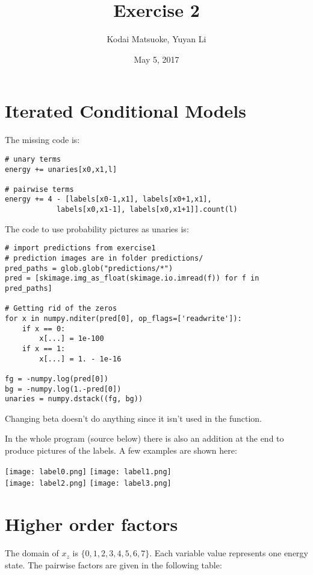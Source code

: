 \documentclass[12pt,a4paper]{scrartcl}
\author{Kodai Matsuoke, Yuyan Li}
\title{Exercise 2}
\date{May 5, 2017}
\begin{document}
\maketitle

\section{Iterated Conditional Models}

The missing code is:

\begin{verbatim}
# unary terms
energy += unaries[x0,x1,l]

# pairwise terms
energy += 4 - [labels[x0-1,x1], labels[x0+1,x1],
            labels[x0,x1-1], labels[x0,x1+1]].count(l)
\end{verbatim}

The code to use probability pictures as unaries is:

\begin{verbatim}
# import predictions from exercise1
# prediction images are in folder predictions/
pred_paths = glob.glob("predictions/*")
pred = [skimage.img_as_float(skimage.io.imread(f)) for f in pred_paths]

# Getting rid of the zeros
for x in numpy.nditer(pred[0], op_flags=['readwrite']):
    if x == 0:
        x[...] = 1e-100
    if x == 1:
        x[...] = 1. - 1e-16

fg = -numpy.log(pred[0])
bg = -numpy.log(1.-pred[0])
unaries = numpy.dstack((fg, bg))
\end{verbatim}

Changing beta doesn't do anything since it isn't used in the function.

In the whole program (source below) there is also an addition at the end to produce pictures of the labels. A few examples are shown here:

\texttt{[image: label0.png]}
\texttt{[image: label1.png]}
\\
\texttt{[image: label2.png]}
\texttt{[image: label3.png]}
\\
% 

\section{Higher order factors}
The domain of $x_z$ is $\{0,1,2,3,4,5,6,7\}$. Each variable value represents one energy state. The pairwise factors are given in the following table:
\end{document}
